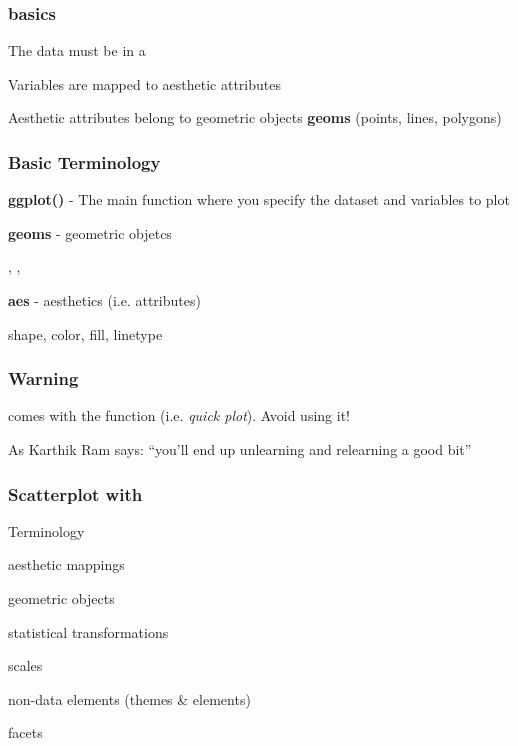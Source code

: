 \documentclass[12pt]{beamer}\usepackage[]{graphicx}\usepackage[]{color}
\begin{document}

\begin{frame}
\frametitle{ basics}

\bbi
  \item The data must be in a 
  \item Variables are mapped to aesthetic attributes
  \item Aesthetic attributes belong to geometric objects \textbf{geoms} (points, lines, polygons)
\ei

\end{frame}


\begin{frame}
\frametitle{Basic Terminology}

\bbi
  \item \textbf{ggplot()} - The main function where you specify the dataset and variables to plot
  \item \textbf{geoms} - geometric objetcs
  \bi
    \item {}, , 
  \ei
  \item \textbf{aes} - aesthetics (i.e. attributes)
  \bi
    \item shape, color, fill, linetype
  \ei
\ei

\end{frame}


\begin{frame}
\frametitle{Warning}

 comes with the function {\hilit {}} (i.e. \textit{quick plot}). Avoid using it! 

\bigskip
As Karthik Ram says: ``you'll end up unlearning and relearning a good bit''
\end{frame}


\begin{frame}[fragile]
\frametitle{Scatterplot with }

Terminology
\bi
  \item aesthetic mappings
  \item geometric objects
  \item statistical transformations
  \item scales
  \item non-data elements (themes \& elements)
  \item facets
\ei

\end{frame}
\end{document}
